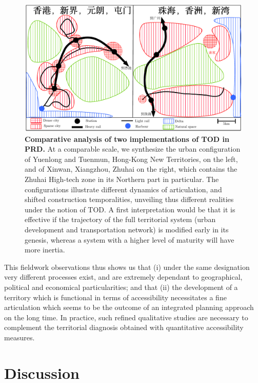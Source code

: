 \documentclass[11pt]{article}
\begin{document}
\begin{figure}
	\includegraphics[width=\linewidth]{tod.pdf}
	\caption{\textbf{Comparative analysis of two implementations of TOD in PRD.} At a comparable scale, we synthesize the urban configuration of Yuenlong and Tuenmun, Hong-Kong New Territories, on the left, and of Xinwan, Xiangzhou, Zhuhai on the right, which contains the Zhuhai High-tech zone in its Northern part in particular. The configurations illustrate different dynamics of articulation, and shifted construction temporalities, unveiling thus different realities under the notion of TOD. A first interpretation would be that it is effective if the trajectory of the full territorial system (urban development and transportation network) is modified early in its genesis, whereas a system with a higher level of maturity will have more inertia.\label{fig:qualitative:schema}}
\end{figure}



This fieldwork observations thus shows us that (i) under the same designation very different processes exist, and are extremely dependant to geographical, political and economical particularities; and that (ii) the development of a territory which is functional in terms of accessibility necessitates a fine articulation which seems to be the outcome of an integrated planning approach on the long time. In practice, such refined qualitative studies are necessary to complement the territorial diagnosis obtained with quantitative accessibility measures.



\section{Discussion}
\end{document}
